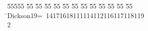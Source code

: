 %
%
\begin{tabbing}
55555 \= 55 \= 55 \= 55 \= 55 \= 55 \= 55 \= 55 \= 55 \= 55 \= 55 \= 55 \= 55 \= \>Dickson19=\ 14171618111114112116117118119\ \\[0pt]
2\>\end{tabbing}

